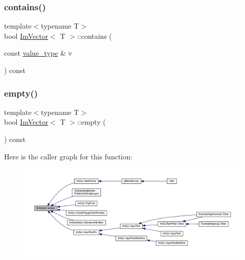 \subsubsection{\texorpdfstring{contains()}{contains()}}
{\footnotesize\ttfamily template$<$typename T$>$ \\
bool \mbox{\hyperlink{class_im_vector}{Im\+Vector}}$<$ T $>$\+::contains (\begin{DoxyParamCaption}\item[{const \mbox{\hyperlink{class_im_vector_a8bd77e4e7581d8e5f9e98d7c2f3c2a80}{value\+\_\+type}} \&}]{v }\end{DoxyParamCaption}) const\hspace{0.3cm}{\ttfamily [inline]}}

\mbox{\label{class_im_vector_aa53e48a5272f4bad1099368769514ff1}} 
\subsubsection{\texorpdfstring{empty()}{empty()}}
{\footnotesize\ttfamily template$<$typename T$>$ \\
bool \mbox{\hyperlink{class_im_vector}{Im\+Vector}}$<$ T $>$\+::empty (\begin{DoxyParamCaption}{ }\end{DoxyParamCaption}) const\hspace{0.3cm}{\ttfamily [inline]}}

Here is the caller graph for this function\+:
\nopagebreak
\begin{figure}[H]
\begin{center}
\leavevmode
\includegraphics[width=350pt]{class_im_vector_aa53e48a5272f4bad1099368769514ff1_icgraph}
\end{center}
\end{figure}
\mbox{\label{class_im_vector_a947fbc3b1d8c1997e51ae6caab440379}} 
